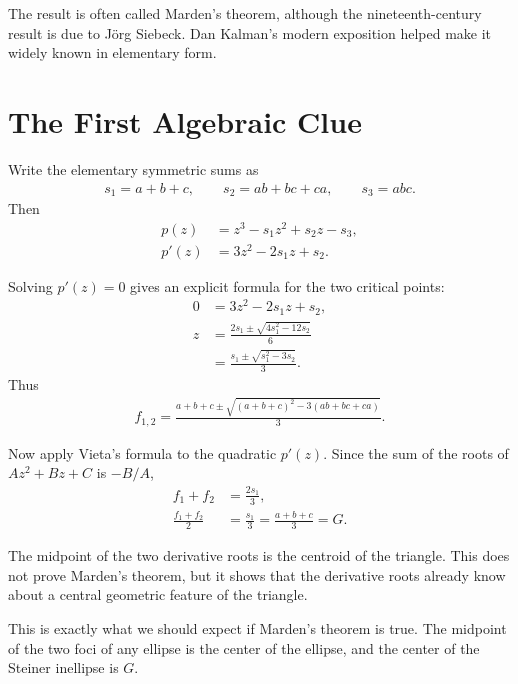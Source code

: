 \documentclass[11pt]{article}
\begin{document}
The result is often called Marden's theorem, although the nineteenth-century result is due to J\"org Siebeck. Dan Kalman's modern exposition helped make it widely known in elementary form.

\section{The First Algebraic Clue}

Write the elementary symmetric sums as
\begin{align}
  s_1=a+b+c,\qquad
  s_2=ab+bc+ca,\qquad
  s_3=abc.
\end{align}
Then
\begin{align}
  p(z)
    &=z^3-s_1z^2+s_2z-s_3, \\
  p'(z)
    &=3z^2-2s_1z+s_2.
  \label{eq:cubic-derivative}
\end{align}

Solving \(p'(z)=0\) gives an explicit formula for the two critical points:
\begin{align}
  0&=3z^2-2s_1z+s_2,\\
  z
    &=\frac{2s_1\pm \sqrt{4s_1^2-12s_2}}{6} \\
    &=\frac{s_1\pm \sqrt{s_1^2-3s_2}}{3}.
  \label{eq:critical-point-formula}
\end{align}
Thus
\begin{align}
  f_{1,2}
  =
  \frac{a+b+c\pm \sqrt{(a+b+c)^2-3(ab+bc+ca)}}{3}.
\end{align}

Now apply Vieta's formula to the quadratic \(p'(z)\). Since the sum of the roots of \(Az^2+Bz+C\) is \(-B/A\),
\begin{align}
  f_1+f_2
    &=\frac{2s_1}{3},\\
  \frac{f_1+f_2}{2}
    &=\frac{s_1}{3}
      =\frac{a+b+c}{3}
      =G.
  \label{eq:critical-points-midpoint}
\end{align}

\begin{resultbox}
The midpoint of the two derivative roots is the centroid of the triangle. This does not prove Marden's theorem, but it shows that the derivative roots already know about a central geometric feature of the triangle.
\end{resultbox}

This is exactly what we should expect if Marden's theorem is true. The midpoint of the two foci of any ellipse is the center of the ellipse, and the center of the Steiner inellipse is \(G\).
\end{document}
